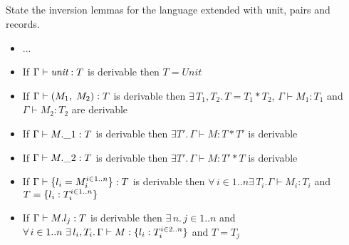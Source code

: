 \subsection{}

State the inversion lemmas for the language extended with unit, pairs and records.

\begin{itemize}
	\item ...
	\item If $\Gamma \vdash \emph{unit}: T$ is derivable then $T = Unit$
	\item If $\Gamma \vdash (M_1,\;M_2): T$ is derivable then
	      $\exists\,T_1, T_2.\, T = T_1 \ast T_2$, $\Gamma \vdash M_1: T_1$ and
	      $\Gamma \vdash M_2: T_2$ are derivable
	\item If $\Gamma \vdash M.\_1: T$ is derivable then
	      $\exists T'.\, \Gamma \vdash M: T \ast T'$ is derivable
	\item If $\Gamma \vdash M.\_2: T$ is derivable then
	      $\exists T'.\, \Gamma \vdash M: T' \ast T$ is derivable
	\item If $\Gamma \vdash \{l_i=M_i^{i \in 1..n}\}: T$ is derivable
	      then $\forall\, i \in 1..n \exists\, T_i. \Gamma \vdash M_i: T_i$ and
	      $T = \{l_i: T_i^{i \in 1..n}\}$
	\item If $\Gamma \vdash M.l_j: T$ is derivable then $\exists\, n.\,j \in 1..n$ and
	      $\forall\, i \in 1..n\ \exists\, l_i, T_i.\,\Gamma \vdash M: \{l_i: T_i^{i \in 2..n}\}$
	      and $T = T_j$
\end{itemize}
